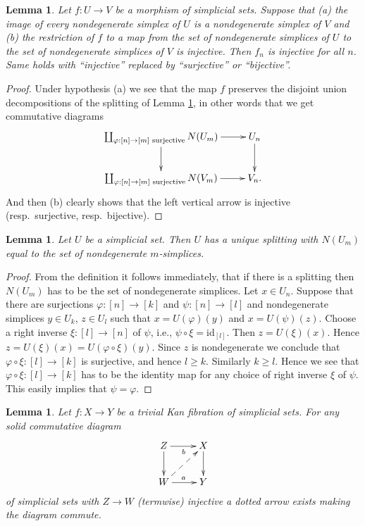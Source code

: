\documentclass{stacks-project}
\theoremstyle{plain}
\newtheorem{lemma}[subsection]{Lemma}
\theoremstyle{definition}
\theoremstyle{remark}
\numberwithin{equation}{subsection}
\begin{document}
\begin{lemma}
\label{lemma-injective-map-simplicial-sets}
Let $f : U \to V$ be a morphism of simplicial sets.
Suppose that (a) the image of every nondegenerate simplex of
$U$ is a nondegenerate simplex of $V$ and (b) the restriction
of $f$ to a map from the set of nondegenerate simplices of $U$
to the set of nondegenerate simplices of $V$ is injective.
Then $f_n$ is injective for all $n$.
Same holds with ``injective'' replaced by
``surjective'' or ``bijective''.
\end{lemma}

\begin{proof}
Under hypothesis (a) we see that the map $f$ preserves
the disjoint union decompositions of the splitting
of Lemma \ref{lemma-splitting-simplicial-sets}, in other words
that we get commutative diagrams
$$
\xymatrix{
\coprod\nolimits_{\varphi : [n] \to [m]\text{ surjective}}
N(U_m)
\ar[r] \ar[d] &
U_n \ar[d] \\
\coprod\nolimits_{\varphi : [n] \to [m]\text{ surjective}}
N(V_m)
\ar[r] &
V_n.
}
$$
And then (b) clearly shows that the left vertical arrow is
injective (resp.\ surjective, resp.\ bijective).
\end{proof}

\begin{lemma}
\label{lemma-splitting-simplicial-sets}
Let $U$ be a simplicial set. Then $U$ has a unique splitting
with $N(U_m)$ equal to the set of nondegenerate $m$-simplices.
\end{lemma}

\begin{proof}
From the definition it follows immediately, that if there is a
splitting then $N(U_m)$ has to be the set of nondegenerate simplices.
Let $x \in U_n$. Suppose that there are surjections $\varphi : [n] \to [k]$
and $\psi : [n] \to [l]$ and nondegenerate simplices
$y \in U_k$, $z \in U_l$ such that $x = U(\varphi)(y)$
and $x = U(\psi)(z)$. Choose a right inverse $\xi : [l] \to [n]$
of $\psi$, i.e., $\psi \circ \xi = \text{id}_{[l]}$.
Then $z = U(\xi)(x)$. Hence $z = U(\xi)(x) = U(\varphi \circ \xi)(y)$.
Since $z$ is nondegenerate we conclude that $\varphi \circ \xi :
[l] \to [k]$ is surjective, and hence $l \geq k$. Similarly
$k \geq l$. Hence we see that $\varphi \circ \xi : [l] \to [k]$
has to be the identity map for any choice of right inverse
$\xi$ of $\psi$. This easily implies that $\psi = \varphi$.
\end{proof}

\begin{lemma}
\label{lemma-trivial-kan}
Let $f : X \to Y$ be a trivial Kan fibration of simplicial sets.
For any solid commutative diagram
$$
\xymatrix{
Z \ar[r]_b \ar[d] & X \ar[d] \\
W \ar[r]^a \ar@{-->}[ru] & Y
}
$$
of simplicial sets with $Z \to W$ (termwise) injective
a dotted arrow exists making the diagram commute.
\end{lemma}
\end{document}
